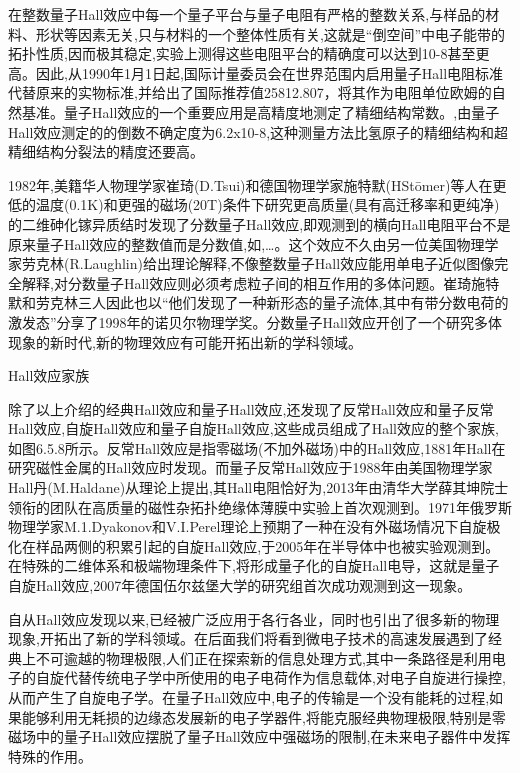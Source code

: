 在整数量子Hall效应中每一个量子平台与量子电阻有严格的整数关系,与样品的材料、形状等因素无关,只与材料的一个整体性质有关,这就是“倒空间”中电子能带的拓扑性质,因而极其稳定,实验上测得这些电阻平台的精确度可以达到10-8甚至更高。因此,从1990年1月1日起,国际计量委员会在世界范围内启用量子Hall电阻标准代替原来的实物标准,并给出了国际推荐值25812.807，将其作为电阻单位欧姆的自然基准。量子Hall效应的一个重要应用是高精度地测定了精细结构常数。,由量子Hall效应测定的的倒数不确定度为6.2x10-8,这种测量方法比氢原子的精细结构和超精细结构分裂法的精度还要高。

1982年,美籍华人物理学家崔琦(D.Tsui)和德国物理学家施特默(HStōmer)等人在更低的温度(0.1K)和更强的磁场(20T)条件下研究更高质量(具有高迁移率和更纯净)的二维砷化镓异质结时发现了分数量子Hall效应,即观测到的横向Hall电阻平台不是原来量子Hall效应的整数值而是分数值,如,…。这个效应不久由另一位美国物理学家劳克林(R.Laughlin)给出理论解释,不像整数量子Hall效应能用单电子近似图像完全解释,对分数量子Hall效应则必须考虑粒子间的相互作用的多体问题。崔琦施特默和劳克林三人因此也以“他们发现了一种新形态的量子流体,其中有带分数电荷的激发态”分享了1998年的诺贝尔物理学奖。分数量子Hall效应开创了一个研究多体现象的新时代,新的物理效应有可能开拓出新的学科领域。

Hall效应家族

除了以上介绍的经典Hall效应和量子Hall效应,还发现了反常Hall效应和量子反常Hall效应,自旋Hall效应和量子自旋Hall效应,这些成员组成了Hall效应的整个家族,如图6.5.8所示。反常Hall效应是指零磁场(不加外磁场)中的Hall效应,1881年Hall在研究磁性金属的Hall效应时发现。而量子反常Hall效应于1988年由美国物理学家Hall丹(M.Haldane)从理论上提出,其Hall电阻恰好为,2013年由清华大学薛其坤院士领衔的团队在高质量的磁性杂拓扑绝缘体薄膜中实验上首次观测到。1971年俄罗斯物理学家M.1.Dyakonov和V.I.Perel理论上预期了一种在没有外磁场情况下自旋极化在样品两侧的积累引起的自旋Hall效应,于2005年在半导体中也被实验观测到。在特殊的二维体系和极端物理条件下,将形成量子化的自旋Hall电导，这就是量子自旋Hall效应,2007年德国伍尔兹堡大学的研究组首次成功观测到这一现象。

自从Hall效应发现以来,已经被广泛应用于各行各业，同时也引出了很多新的物理现象,开拓出了新的学科领域。在后面我们将看到微电子技术的高速发展遇到了经典上不可逾越的物理极限,人们正在探索新的信息处理方式,其中一条路径是利用电子的自旋代替传统电子学中所使用的电子电荷作为信息载体,对电子自旋进行操控,从而产生了自旋电子学。在量子Hall效应中,电子的传输是一个没有能耗的过程,如果能够利用无耗损的边缘态发展新的电子学器件,将能克服经典物理极限,特别是零磁场中的量子Hall效应摆脱了量子Hall效应中强磁场的限制,在未来电子器件中发挥特殊的作用。



